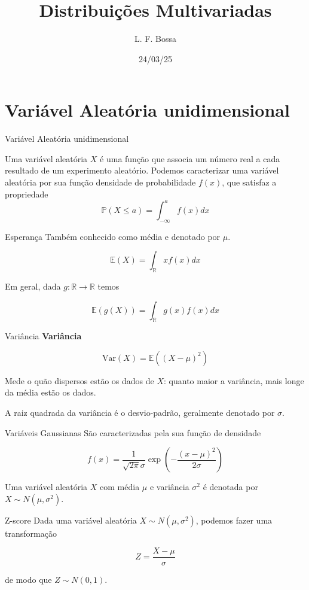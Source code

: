\documentclass[
  ignorenonframetext,
  aspectratio=169,
]{beamer}
\title{Distribuições Multivariadas}
\author{L. F. Bossa}
\date{24/03/25}
\institute{UFSC}
\newcommand{\PP}{\mathbb{P}}
\newcommand{\RR}{\mathbb{R}}
\begin{document}
\frame{\titlepage}

\section{Variável Aleatória unidimensional}

\begin{frame}{Variável Aleatória unidimensional}

Uma variável aleatória $X$ é uma função que associa um número real a cada resultado de um experimento aleatório.
Podemos caracterizar uma variável aleatória por sua função densidade de probabilidade $f(x)$, que satisfaz a propriedade
\[\PP(X \le a) = \int_{-\infty}^{a} f(x) dx \] 
\end{frame}

\begin{frame}{Esperança}
Também conhecido como média e denotado por \(\mu\).

\[\mathbb{E}(X) = \int_{\RR} xf(x) dx\]
\end{frame}

\begin{frame}
Em geral, dada \(g: \RR\to \RR\) temos

\[\mathbb{E}(g(X)) = \int_{\RR} g(x)f(x) dx\]
\end{frame}

\begin{frame}{Variância}
\textbf{Variância}

\[\text{Var}(X) = \mathbb{E}( (X - \mu)^2)\]

Mede o quão dispersos estão os dados de \(X\): quanto maior a variância,
mais longe da média estão os dados.

A raiz quadrada da variância é o desvio-padrão, geralmente denotado por
\(\sigma\).
\end{frame}

\begin{frame}{Variáveis Gaussianas}
São caracterizadas pela sua função de densidade

\[f(x) = \frac{1}{\sqrt{2\pi}\sigma}\exp\left(-\frac{(x-\mu)^2}{2\sigma}\right)\]

Uma variável aleatória \(X\) com média \(\mu\) e variância \(\sigma^2\)
é denotada por \(X\sim N(\mu,\sigma^2)\).
\end{frame}

\begin{frame}{Z-score}
Dada uma variável aleatória \(X\sim N(\mu,\sigma^2)\), podemos fazer uma
transformação

\[Z = \frac{X- \mu}{\sigma}\]

de modo que \(Z \sim  N(0,1)\).
\end{frame}
\end{document}
